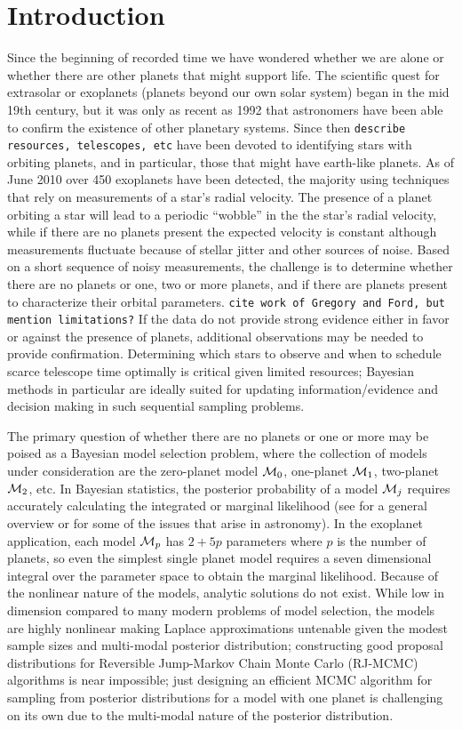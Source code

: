 \section{Introduction}

Since the beginning of recorded time we have wondered whether we are
alone or whether there are other planets that might support life. The
scientific quest for extrasolar or exoplanets (planets beyond our own
solar system) began in the mid 19th century, but it was only as recent
as 1992 that astronomers have been able to confirm the existence of
other planetary systems.  Since then {\tt describe resources,
  telescopes, etc} have been devoted to identifying stars with
orbiting planets, and in particular, those that might have earth-like
planets. As of June 2010 over 450 exoplanets have been detected, the
majority using techniques that rely on measurements of a star's radial
velocity.  The presence of a planet orbiting a star will lead to a
periodic ``wobble'' in the the star's radial velocity, while if there
are no planets present the expected velocity is constant although
measurements fluctuate because of stellar jitter and other sources of
noise.  Based on a short sequence of noisy measurements, the challenge
is to determine whether there are no planets or one, two or more
planets, and if there are planets present to characterize their orbital
parameters.  {\tt cite work of Gregory and Ford, but mention
  limitations?}  If the data do not provide strong evidence either in
favor or against the presence of planets, additional observations may
be needed to provide confirmation.  Determining which stars to observe
and when to schedule scarce telescope time optimally is critical given
limited resources; Bayesian methods in particular are ideally suited
for updating information/evidence and decision
making in such sequential sampling problems.


The primary question of whether there are no planets or one or more
may be poised as a Bayesian model selection problem, where the
collection of models under consideration are the zero-planet model
${\cal{M}}_0$, one-planet ${\cal{M}}_1$, two-planet ${\cal{M}}_2$, etc.  In Bayesian
statistics, the posterior probability of a model ${\cal{M}}_j$ requires
accurately calculating the integrated or marginal likelihood (see
\citet{Clyd:Geor:2004} for a general overview or
\citet{Clyd:etal:2005} for some of the issues that arise in
astronomy).  In the exoplanet application, each model ${\cal{M}}_p$ has
$2+5p$ parameters where $p$ is the number of planets, so even the
simplest single planet model requires a seven dimensional integral
over the parameter space to obtain the marginal likelihood.  Because
of the nonlinear nature of the models, analytic solutions do not
exist.  While low in dimension compared to many modern problems of
model selection, the models are highly nonlinear making Laplace
approximations untenable given the modest sample sizes and multi-modal
posterior distribution; constructing good proposal distributions for
Reversible Jump-Markov Chain Monte Carlo (RJ-MCMC) algorithms is near
impossible; just designing an efficient MCMC algorithm for sampling
from posterior distributions for a model with one planet is
challenging on its own due to the multi-modal nature of the posterior
distribution.  


